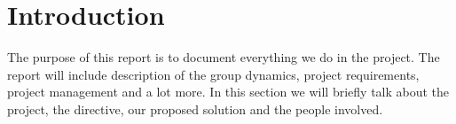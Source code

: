 \section{Introduction}
The purpose of this report is to document everything we do in the project. The
report will include description of the group dynamics, project requirements,
project management and a lot more. In this section we will briefly talk about
the project, the directive, our proposed solution and the people involved. 


